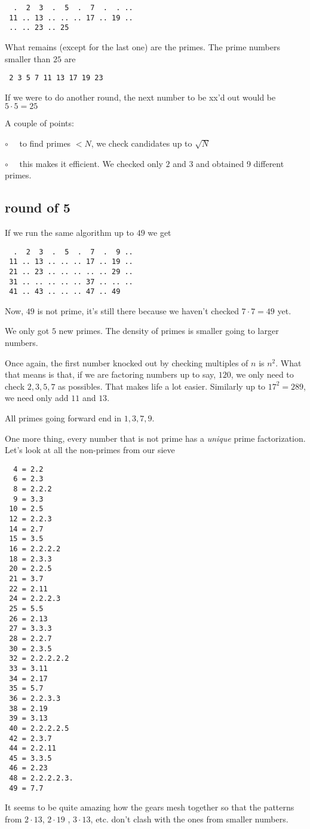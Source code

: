\documentclass[11pt, oneside]{article}
\begin{document}
\begin{verbatim}
  .  2  3  .  5  .  7  .  . ..
 11 .. 13 .. .. .. 17 .. 19 ..
 .. .. 23 .. 25
 \end{verbatim}
 
 What remains (except for the last one) are the primes.  The prime numbers smaller than $25$ are
 
 \begin{verbatim}
 2 3 5 7 11 13 17 19 23
 \end{verbatim}

If we were to do another round, the next number to be xx'd out would be $5 \cdot 5 = 25$
 
A couple of points:

$\circ$ \ \ to find primes $< N$, we check candidates up to $\sqrt{N}$

$\circ$ \ \ this makes it efficient.  We checked only $2$ and $3$ and obtained 9 different primes.

\subsection*{round of 5}

If we run the same algorithm up to $49$ we get

\begin{verbatim}
  .  2  3  .  5  .  7  .  9 ..
 11 .. 13 .. .. .. 17 .. 19 ..
 21 .. 23 .. .. .. .. .. 29 ..
 31 .. .. .. .. .. 37 .. .. ..
 41 .. 43 .. .. .. 47 .. 49
 \end{verbatim}
 
 Now, $49$ is not prime, it's still there because we haven't checked $7 \cdot 7 = 49$ yet.
 
 We only got $5$ new primes.  The density of primes is smaller going to larger numbers.
 
 Once again, the first number knocked out by checking multiples of $n$ is $n^2$.  What that means is that, if we are factoring numbers up to say, $120$, we only need to check $2,3,5,7$ as possibles.  That makes life a lot easier.  Similarly up to $17^2 = 289$, we need only add $11$ and $13$.
 
All primes going forward end in $1,3,7,9$.
 
 One more thing, every number that is not prime has a \emph{unique} prime factorization.  Let's look at all the non-primes from our sieve
 
 \begin{verbatim}
  4 = 2.2
  6 = 2.3
  8 = 2.2.2
  9 = 3.3
 10 = 2.5
 12 = 2.2.3
 14 = 2.7
 15 = 3.5
 16 = 2.2.2.2
 18 = 2.3.3
 20 = 2.2.5
 21 = 3.7
 22 = 2.11
 24 = 2.2.2.3
 25 = 5.5
 26 = 2.13
 27 = 3.3.3
 28 = 2.2.7
 30 = 2.3.5
 32 = 2.2.2.2.2
 33 = 3.11
 34 = 2.17
 35 = 5.7
 36 = 2.2.3.3
 38 = 2.19
 39 = 3.13
 40 = 2.2.2.2.5
 42 = 2.3.7
 44 = 2.2.11
 45 = 3.3.5
 46 = 2.23
 48 = 2.2.2.2.3.
 49 = 7.7
 \end{verbatim}
 
 It seems to be quite amazing how the gears mesh together so that the patterns from $2 \cdot 13$, $2 \cdot 19$ , $3 \cdot 13$, etc. don't clash with the ones from smaller numbers.
 
\end{document}

